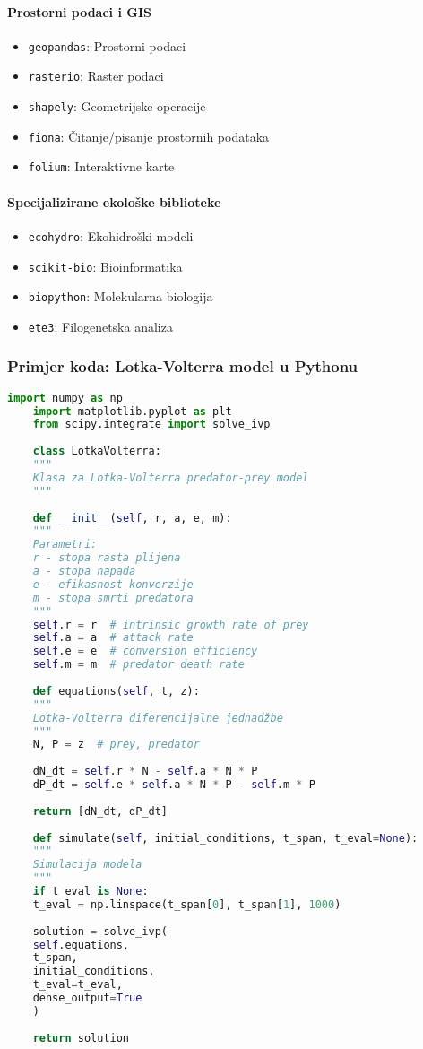 \documentclass[11pt,oneside]{book}
\begin{document}
\paragraph{Prostorni podaci i GIS}

\begin{itemize}
	\item \texttt{geopandas}: Prostorni podaci
	\item \texttt{rasterio}: Raster podaci
	\item \texttt{shapely}: Geometrijske operacije
	\item \texttt{fiona}: Čitanje/pisanje prostornih podataka
	\item \texttt{folium}: Interaktivne karte
\end{itemize}

\paragraph{Specijalizirane ekološke biblioteke}

\begin{itemize}
	\item \texttt{ecohydro}: Ekohidroški modeli
	\item \texttt{scikit-bio}: Bioinformatika
	\item \texttt{biopython}: Molekularna biologija
	\item \texttt{ete3}: Filogenetska analiza
\end{itemize}

\subsubsection{Primjer koda: Lotka-Volterra model u Pythonu}

\begin{lstlisting}[language=Python, caption=Lotka-Volterra predator-prey model (dio 1)]
	import numpy as np
	import matplotlib.pyplot as plt
	from scipy.integrate import solve_ivp
	
	class LotkaVolterra:
	"""
	Klasa za Lotka-Volterra predator-prey model
	"""
	
	def __init__(self, r, a, e, m):
	"""
	Parametri:
	r - stopa rasta plijena
	a - stopa napada
	e - efikasnost konverzije
	m - stopa smrti predatora
	"""
	self.r = r  # intrinsic growth rate of prey
	self.a = a  # attack rate
	self.e = e  # conversion efficiency
	self.m = m  # predator death rate
	
	def equations(self, t, z):
	"""
	Lotka-Volterra diferencijalne jednadžbe
	"""
	N, P = z  # prey, predator
	
	dN_dt = self.r * N - self.a * N * P
	dP_dt = self.e * self.a * N * P - self.m * P
	
	return [dN_dt, dP_dt]
	
	def simulate(self, initial_conditions, t_span, t_eval=None):
	"""
	Simulacija modela
	"""
	if t_eval is None:
	t_eval = np.linspace(t_span[0], t_span[1], 1000)
	
	solution = solve_ivp(
	self.equations, 
	t_span, 
	initial_conditions,
	t_eval=t_eval,
	dense_output=True
	)
	
	return solution
\end{lstlisting}
\end{document}
